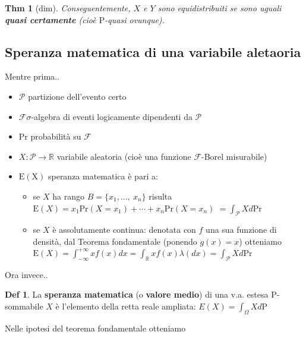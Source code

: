 \documentclass[a4paper,11pt]{article}
\theoremstyle{plain}
\newtheorem{thm}{Thm}[section]
\theoremstyle{definition}
\newtheorem{defn}{Def}[section]
\theoremstyle{remark}
\begin{document}
\begin{thm} [dim] Conseguentemente, $X$ e $Y$ sono equidistribuiti se sono
uguali \textbf{quasi certamente} (cioè $\mathrm{P}$-quasi ovunque).
\end{thm}



\subsection{Speranza matematica di una variabile aletaoria}
Mentre prima..

\begin{itemize}
    \item $\mathcal{P}$ partizione dell'evento certo
\item $\mathcal{F} \sigma$-algebra di eventi logicamente dipendenti da $\mathcal{P}$
\item $\mathrm{P}\mathrm{r}$ probabilit\`{a} su $\mathcal{F}$
\item  $X:\mathcal{P}\rightarrow \mathbb{R}$ variabile aleatoria (cio\`{e} una funzione $\mathcal{F}$-Borel misurabile)
\item $\mathrm{E}(\mathrm{X})$ speranza matematica  è pari a:
\begin{itemize}
    \item  se $X$ ha rango  $B=\{x_{1}, ... ,\ x_{n}\}$ risulta
$\mathrm{E}(X)=x_{1}\mathrm{P}\mathrm{r}(X=x_{1})+\cdots+x_{n}\mathrm{P}\mathrm{r}(X=x_{n})$ $=\displaystyle \int_{\mathcal{P}}Xd\mathrm{P}\mathrm{r}$
\item  se $X$ è assolutamente continua: denotata con $f$ una sua funzione di densit\`{a}, dal Teorema fondamentale (ponendo $g(x)=x$) otteniamo
$\mathrm{E}(X)=\displaystyle \int_{-\infty}^{+\infty}xf(x)dx=\displaystyle \int_{\mathbb{R}}xf(x)\lambda(dx)=\displaystyle \int_{\mathcal{P}}Xd\mathrm{P}\mathrm{r}$
\end{itemize}
\end{itemize}

\noindent
Ora invece..\\

\begin{defn}
La \textbf{speranza matematica} (o \textbf{valore medio}) di una v.a. estesa P-sommabile $X$ è l'elemento della retta reale ampliata: 
$\displaystyle E(X)= \int_{\Omega} X d \mathrm{P}$
\end{defn}

\noindent
Nelle ipotesi del teorema fondamentale otteniamo \\
\end{document}
